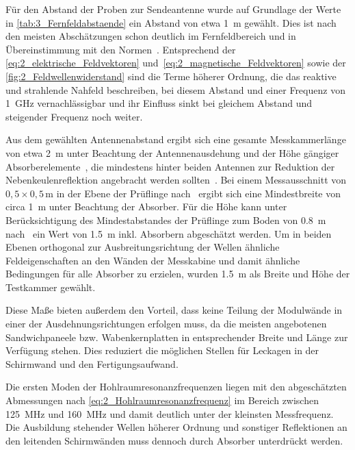 Für den Abstand der Proben zur Sendeantenne wurde auf Grundlage der Werte in \Tabelle\ref{tab:3_Fernfeldabstaende} ein Abstand von etwa \SI{1}{\meter} gewählt. Dies ist nach den meisten Abschätzungen schon deutlich im Fernfeldbereich und in Übereinstimmung mit den Normen~\cite{DIN_EN_61000-4-3, VG_95373_15}. Entsprechend der \Gleichungen\eqref{eq:2_elektrische_Feldvektoren} und~\eqref{eq:2_magnetische_Feldvektoren} sowie der \Abb\ref{fig:2_Feldwellenwiderstand} sind die Terme höherer Ordnung, die das reaktive und strahlende Nahfeld beschreiben, bei diesem Abstand und einer Frequenz von \SI{1}{\giga\hertz} vernachlässigbar und ihr Einfluss sinkt bei gleichem Abstand und steigender Frequenz noch weiter. 
\par
\vspace{\linespace}
Aus dem gewählten Antennenabstand ergibt sich eine gesamte Messkammerlänge von etwa \SI{2}{\meter} unter Beachtung der Antennenausdehung und der Höhe gängiger Absorberelemente~\cite{Telemeter_Produktseite, EMV-Support_Produktseite}, die mindestens hinter beiden Antennen zur Reduktion der Nebenkeulenreflektion angebracht werden sollten~\cite{Optimierung_Feldhomogenitaet, EM_Schirmung}. Bei einem Messausschnitt von $0,5 \times 0,5\,\si{\meter}$ in der Ebene der Prüflinge nach~\cite{DIN_EN_61000-4-3} ergibt sich eine Mindestbreite von circa \SI{1}{\meter} unter Beachtung der Absorber. Für die Höhe kann unter Berücksichtigung des Mindestabstandes der Prüflinge zum Boden von \SI{0,8}{\meter} nach~\cite{DIN_EN_61000-4-3, DIN_EN_61000-5-7} ein Wert von \SI{1,5}{\meter} inkl. Absorbern abgeschätzt werden. Um in beiden Ebenen orthogonal zur Ausbreitungsrichtung der Wellen ähnliche Feldeigenschaften an den Wänden der Messkabine und damit ähnliche Bedingungen für alle Absorber zu erzielen, wurden \SI{1,5}{\meter} als Breite und Höhe der Testkammer gewählt. 
\par
\vspace{\linespace}
Diese Maße bieten außerdem den Vorteil, dass keine Teilung der Modulwände in einer der Ausdehnungsrichtungen erfolgen muss, da die meisten angebotenen Sandwichpaneele bzw. Wabenkernplatten in entsprechender Breite und Länge zur Verfügung stehen. Dies reduziert die möglichen Stellen für Leckagen in der Schirmwand und den Fertigungsaufwand.
\par
\vspace{\linespace}
Die ersten Moden der Hohlraumresonanzfrequenzen liegen mit den abgeschätzten Abmessungen nach \Gleichung\eqref{eq:2_Hohlraumresonanzfrequenz} im Bereich zwischen \SI{125}{\mega\hertz} und \SI{160}{\mega\hertz} und damit deutlich unter der kleinsten Messfrequenz. Die Ausbildung stehender Wellen höherer Ordnung und sonstiger Reflektionen an den leitenden Schirmwänden muss dennoch durch Absorber unterdrückt werden.
